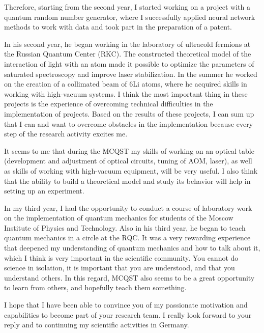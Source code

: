 Therefore, starting from the second year, I started working on a project with a quantum random number generator, where I successfully applied neural network methods to work with data and took part in the preparation of a patent.

In his second year, he began working in the laboratory of ultracold fermions at the Russian Quantum Center (RKC). The constructed theoretical model of the interaction of light with an atom made it possible to optimize the parameters of saturated spectroscopy and improve laser stabilization. In the summer he worked on the creation of a collimated beam of 6Li atoms, where he acquired skills in working with high-vacuum systems. I think the most important thing in these projects is the experience of overcoming technical difficulties in the implementation of projects. Based on the results of these projects, I can sum up that I can and want to overcome obstacles in the implementation because every step of the research activity excites me.

It seems to me that during the MCQST my skills of working on an optical table (development and adjustment of optical circuits, tuning of AOM, laser), as well as skills of working with high-vacuum equipment, will be very useful. I also think that the ability to build a theoretical model and study its behavior will help in setting up an experiment.

In my third year, I had the opportunity to conduct a course of laboratory work on the implementation of quantum mechanics for students of the Moscow Institute of Physics and Technology. Also in his third year, he began to teach quantum mechanics in a circle at the RQC. It was a very rewarding experience that deepened my understanding of quantum mechanics and how to talk about it, which I think is very important in the scientific community. You cannot do science in isolation, it is important that you are understood, and that you understand others. In this regard, MCQST also seems to be a great opportunity to learn from others, and hopefully teach them something.

I hope that I have been able to convince you of my passionate motivation and capabilities to become part of your research team. I really look forward to your reply and to continuing my scientific activities in Germany.
